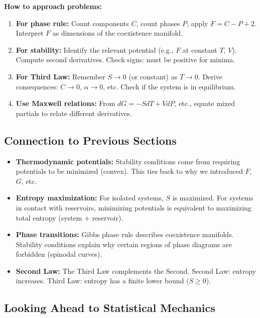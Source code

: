 \documentclass[9pt,twocoloumn]{article}
\begin{document}
\textbf{How to approach problems:}

\begin{enumerate}
    \item \textbf{For phase rule:} Count components $C$, count phases $P$, apply $F = C - P + 2$. Interpret $F$ as dimensions of the coexistence manifold.

    \item \textbf{For stability:} Identify the relevant potential (e.g., $F$ at constant $T$, $V$). Compute second derivatives. Check signs: must be positive for minima.

    \item \textbf{For Third Law:} Remember $S \to 0$ (or constant) as $T \to 0$. Derive consequences: $C \to 0$, $\alpha \to 0$, etc. Check if the system is in equilibrium.

    \item \textbf{Use Maxwell relations:} From $dG = -S dT + V dP$, etc., equate mixed partials to relate different derivatives.
\end{enumerate}

\subsection{Connection to Previous Sections}

\begin{itemize}
    \item \textbf{Thermodynamic potentials:} Stability conditions come from requiring potentials to be minimized (convex). This ties back to why we introduced $F$, $G$, etc.

    \item \textbf{Entropy maximization:} For isolated systems, $S$ is maximized. For systems in contact with reservoirs, minimizing potentials is equivalent to maximizing total entropy (system + reservoir).

    \item \textbf{Phase transitions:} Gibbs phase rule describes coexistence manifolds. Stability conditions explain why certain regions of phase diagrams are forbidden (spinodal curves).

    \item \textbf{Second Law:} The Third Law complements the Second. Second Law: entropy increases. Third Law: entropy has a finite lower bound ($S \geq 0$).
\end{itemize}

\subsection{Looking Ahead to Statistical Mechanics}
\end{document}
